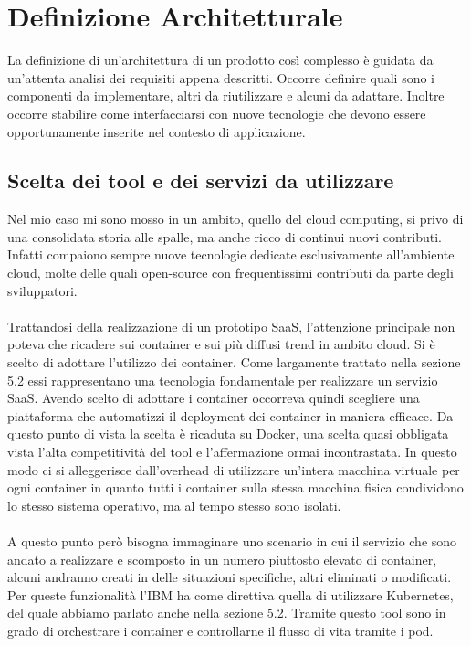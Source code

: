 \section{Definizione Architetturale}
La definizione di un'architettura di un prodotto così complesso è guidata da un'attenta analisi dei requisiti appena descritti. Occorre definire quali sono i componenti da implementare, altri da riutilizzare e alcuni da adattare. Inoltre occorre stabilire come interfacciarsi con nuove tecnologie che devono essere opportunamente inserite nel contesto di applicazione.
\subsection{Scelta dei tool e dei servizi da utilizzare}
Nel mio caso mi sono mosso in un ambito, quello del cloud computing, si privo di una consolidata storia alle spalle, ma anche ricco di continui nuovi contributi. Infatti compaiono sempre nuove tecnologie dedicate esclusivamente all'ambiente cloud, molte delle quali open-source con frequentissimi contributi da parte degli sviluppatori.

\paragraph{}
Trattandosi della realizzazione di un prototipo SaaS, l'attenzione principale non poteva che ricadere sui container e sui più diffusi trend in ambito cloud. Si è scelto di adottare l'utilizzo dei container. Come largamente trattato nella sezione 5.2 essi rappresentano una tecnologia fondamentale per realizzare un servizio SaaS. Avendo scelto di adottare i container occorreva quindi scegliere una piattaforma che automatizzi il deployment dei container in maniera efficace. Da questo punto di vista la scelta è ricaduta su Docker, una scelta quasi obbligata vista l'alta competitività del tool e l'affermazione ormai incontrastata. In questo modo ci si alleggerisce dall'overhead di utilizzare un'intera macchina virtuale per ogni container in quanto tutti i container sulla stessa macchina fisica condividono lo stesso sistema operativo, ma al tempo stesso sono isolati. 

\paragraph{}
A questo punto però bisogna immaginare uno scenario in cui il servizio che sono andato a realizzare e scomposto in un numero piuttosto elevato di container, alcuni andranno creati in delle situazioni specifiche, altri eliminati o modificati. Per queste funzionalità l'IBM ha come direttiva quella di utilizzare Kubernetes, del quale abbiamo parlato anche nella sezione 5.2. Tramite questo tool sono in grado di orchestrare i container e controllarne il flusso di vita tramite i pod.

